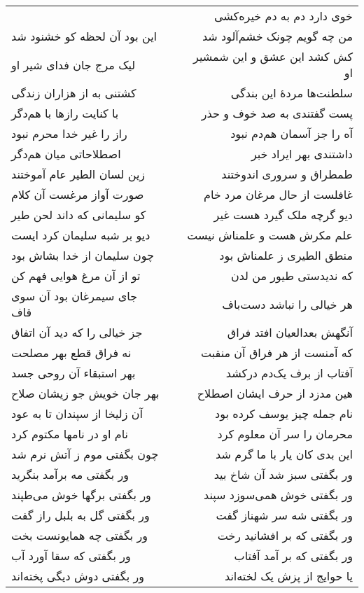 \begin{center}
\begin{longtable}{l p{0.5cm} r}
&&
خوی دارد دم به دم خیره‌کشی
\\
این بود آن لحظه کو خشنود شد
&&
من چه گویم چونک خشم‌آلود شد
\\
لیک مرج جان فدای شیر او
&&
کش کشد این عشق و این شمشیر او
\\
کشتنی به از هزاران زندگی
&&
سلطنت‌ها مردهٔ این بندگی
\\
با کنایت رازها با هم‌دگر
&&
پست گفتندی به صد خوف و حذر
\\
راز را غیر خدا محرم نبود
&&
آه را جز آسمان هم‌دم نبود
\\
اصطلاحاتی میان هم‌دگر
&&
داشتندی بهر ایراد خبر
\\
زین لسان الطیر عام آموختند
&&
طمطراق و سروری اندوختند
\\
صورت آواز مرغست آن کلام
&&
غافلست از حال مرغان مرد خام
\\
کو سلیمانی که داند لحن طیر
&&
دیو گرچه ملک گیرد هست غیر
\\
دیو بر شبه سلیمان کرد ایست
&&
علم مکرش هست و علمناش نیست
\\
چون سلیمان از خدا بشاش بود
&&
منطق الطیری ز علمناش بود
\\
تو از آن مرغ هوایی فهم کن
&&
که ندیدستی طیور من لدن
\\
جای سیمرغان بود آن سوی قاف
&&
هر خیالی را نباشد دست‌باف
\\
جز خیالی را که دید آن اتفاق
&&
آنگهش بعدالعیان افتد فراق
\\
نه فراق قطع بهر مصلحت
&&
که آمنست از هر فراق آن منقبت
\\
بهر استبقاء آن روحی جسد
&&
آفتاب از برف یک‌دم درکشد
\\
بهر جان خویش جو زیشان صلاح
&&
هین مدزد از حرف ایشان اصطلاح
\\
آن زلیخا از سپندان تا به عود
&&
نام جمله چیز یوسف کرده بود
\\
نام او در نامها مکتوم کرد
&&
محرمان را سر آن معلوم کرد
\\
چون بگفتی موم ز آتش نرم شد
&&
این بدی کان یار با ما گرم شد
\\
ور بگفتی مه برآمد بنگرید
&&
ور بگفتی سبز شد آن شاخ بید
\\
ور بگفتی برگها خوش می‌طپند
&&
ور بگفتی خوش همی‌سوزد سپند
\\
ور بگفتی گل به بلبل راز گفت
&&
ور بگفتی شه سر شهناز گفت
\\
ور بگفتی چه همایونست بخت
&&
ور بگفتی که بر افشانید رخت
\\
ور بگفتی که سقا آورد آب
&&
ور بگفتی که بر آمد آفتاب
\\
ور بگفتی دوش دیگی پخته‌اند
&&
یا حوایج از پزش یک لخته‌اند
\\

\end{longtable}
\end{center}
